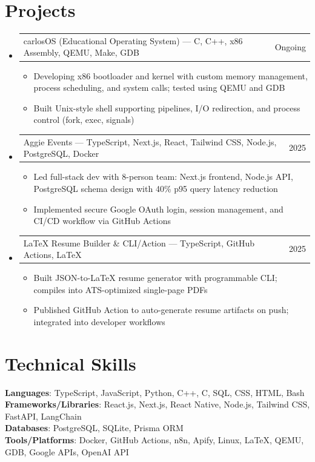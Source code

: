 \documentclass[letterpaper,11pt]{article}
\makeatletter
\newcommand{\resumeItem}[1]{
  \item\small{{#1 \vspace{-2pt}}}
}
\newcommand{\resumeProjectHeading}[2]{
    \item
    \begin{tabular*}{0.97\textwidth}{l@{\extracolsep{\fill}}r}
      \small#1 & #2 \\
    \end{tabular*}\vspace{-7pt}
}
\newcommand{\resumeSubHeadingListStart}{\begin{itemize}[leftmargin=0.15in, label={}]}
\newcommand{\resumeSubHeadingListEnd}{\end{itemize}}
\newcommand{\resumeItemListStart}{\begin{itemize}}
\newcommand{\resumeItemListEnd}{\end{itemize}\vspace{-5pt}}
\makeatother
\begin{document}
\section{Projects}
\resumeSubHeadingListStart
  \resumeProjectHeading
    {carlosOS (Educational Operating System) — C, C++, x86 Assembly, QEMU, Make, GDB}{Ongoing}
    \resumeItemListStart
      \resumeItem{Developing x86 bootloader and kernel with custom memory management, process scheduling, and system calls; tested using QEMU and GDB}
      \resumeItem{Built Unix-style shell supporting pipelines, I/O redirection, and process control (fork, exec, signals)}
    \resumeItemListEnd

  \resumeProjectHeading
    {Aggie Events — TypeScript, Next.js, React, Tailwind CSS, Node.js, PostgreSQL, Docker}{2025}
    \resumeItemListStart
      \resumeItem{Led full-stack dev with 8-person team: Next.js frontend, Node.js API, PostgreSQL schema design with 40\% p95 query latency reduction}
      \resumeItem{Implemented secure Google OAuth login, session management, and CI/CD workflow via GitHub Actions}
    \resumeItemListEnd

  \resumeProjectHeading
    {LaTeX Resume Builder \& CLI/Action — TypeScript, GitHub Actions, LaTeX}{2025}
    \resumeItemListStart
      \resumeItem{Built JSON-to-LaTeX resume generator with programmable CLI; compiles into ATS-optimized single-page PDFs}
      \resumeItem{Published GitHub Action to auto-generate resume artifacts on push; integrated into developer workflows}
    \resumeItemListEnd
\resumeSubHeadingListEnd

\section{Technical Skills}
\begin{itemize}[leftmargin=0.15in, label={}]
  \small{\item{
    \textbf{Languages}{: TypeScript, JavaScript, Python, C++, C, SQL, CSS, HTML, Bash} \\
    \textbf{Frameworks/Libraries}{: React.js, Next.js, React Native, Node.js, Tailwind CSS, FastAPI, LangChain} \\
    \textbf{Databases}{: PostgreSQL, SQLite, Prisma ORM} \\
    \textbf{Tools/Platforms}{: Docker, GitHub Actions, n8n, Apify, Linux, LaTeX, QEMU, GDB, Google APIs, OpenAI API}
  }}
\end{itemize}
\end{document}
